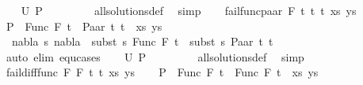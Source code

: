 \begin{isabellebody}
\ \ \isamarkupfalse%
\ {\isachardoublequoteopen}U\ {\isacharquery}{\kern0pt}P\ {\isacharequal}{\kern0pt}\ {\isacharbraceleft}{\kern0pt}{\isacharbraceright}{\kern0pt}{\isachardoublequoteclose}\ \isanewline
\ \ \ \ \isamarkupfalse%
\ all{\isacharunderscore}{\kern0pt}solutions{\isacharunderscore}{\kern0pt}def\ \isamarkupfalse%
\ simp\isanewline
{}\isamarkupfalse%
\isanewline
\ \ \isamarkupfalse%
\ {\isacharparenleft}{\kern0pt}fail{\isacharunderscore}{\kern0pt}func{\isacharunderscore}{\kern0pt}paar\ F\ t\ t{}\ t{}\ xs\ ys{\isacharparenright}{\kern0pt}\isanewline
\ \ \isamarkupfalse%
\ {\isacharquery}{\kern0pt}P\ {\isacharequal}{\kern0pt}\ {\isachardoublequoteopen}{\isacharparenleft}{\kern0pt}Func\ F\ t\ {\isasymapprox}{\isacharquery}{\kern0pt}\ Paar\ t{}\ t{}\ {\isacharhash}{\kern0pt}\ xs{\isacharcomma}{\kern0pt}\ ys{\isacharparenright}{\kern0pt}{\isachardoublequoteclose}\isanewline
\ \ \isamarkupfalse%
\ {\isachardoublequoteopen}{\isasymnexists}\ nabla\ s{\isachardot}{\kern0pt}\ nabla\ {\isasymturnstile}\ subst\ s\ {\isacharparenleft}{\kern0pt}Func\ F\ t{\isacharparenright}{\kern0pt}\ {\isasymapprox}\ subst\ s\ {\isacharparenleft}{\kern0pt}Paar\ t{}\ t{}{\isacharparenright}{\kern0pt}{\isachardoublequoteclose}\isanewline
\ \ \ \ \ \isamarkupfalse%
\ {\isacharparenleft}{\kern0pt}auto\ elim{\isacharcolon}{\kern0pt}\ equ{\isachardot}{\kern0pt}cases{\isacharparenright}{\kern0pt}\isanewline
\ \ \isamarkupfalse%
\ {\isachardoublequoteopen}U\ {\isacharquery}{\kern0pt}P\ {\isacharequal}{\kern0pt}\ {\isacharbraceleft}{\kern0pt}{\isacharbraceright}{\kern0pt}{\isachardoublequoteclose}\ \isanewline
\ \ \ \ \isamarkupfalse%
\ all{\isacharunderscore}{\kern0pt}solutions{\isacharunderscore}{\kern0pt}def\ \isamarkupfalse%
\ simp\isanewline
{}\isamarkupfalse%
\isanewline
\ \ \isamarkupfalse%
\ {\isacharparenleft}{\kern0pt}fail{\isacharunderscore}{\kern0pt}diff{\isacharunderscore}{\kern0pt}func\ F{}\ F{}\ t{}\ t{}\ xs\ ys{\isacharparenright}{\kern0pt}\isanewline
\ \ \isamarkupfalse%
\ {\isacharquery}{\kern0pt}P\ {\isacharequal}{\kern0pt}\ {\isachardoublequoteopen}{\isacharparenleft}{\kern0pt}Func\ F{}\ t{}\ {\isasymapprox}{\isacharquery}{\kern0pt}\ Func\ F{}\ t{}\ {\isacharhash}{\kern0pt}\ xs{\isacharcomma}{\kern0pt}\ ys{\isacharparenright}{\kern0pt}{\isachardoublequoteclose}\isanewline

\end{isabellebody}
